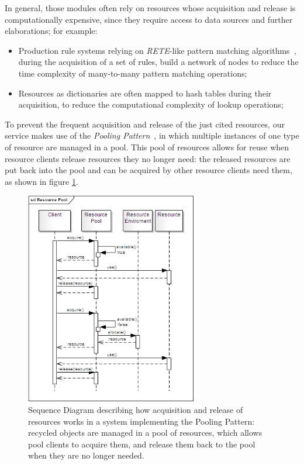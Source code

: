 \documentclass[11pt]{article}
\begin{document}
In general, those modules often rely on resources whose acquisition and release is computationally expensive, since they require access to data sources 
and further elaborations; for example:

\begin{itemize}
 \item Production rule systems relying on \emph{RETE}-like pattern matching algorithms~\citep{forgy}, during the acquisition of a set of rules, build a network of nodes
  to reduce the time complexity of many-to-many pattern matching operations;
 \item Resources as dictionaries are often mapped to hash tables during their acquisition, to reduce the computational complexity of lookup operations; 
\end{itemize}

To prevent the frequent acquisition and release of the just cited resources, our service makes use of the \emph{Pooling Pattern}~\citep{kircher2001}, 
in which multiple instances of one type of resource are managed in a pool.  This pool of resources allows for reuse when resource clients release resources
they no longer need: the released resources are put back into the pool and can be acquired by other resource clients need them, as shown in figure \ref{fig:rp}.

\begin{figure}[!ht]
\begin{center}
\includegraphics[width=7.5cm]{resource_pool}
\end{center}
\caption{Sequence Diagram describing how acquisition and release of resources works in a system implementing the Pooling Pattern: recycled objects are
managed in a pool of resources, which allows pool clients to acquire them, and release them back to the pool when they are no longer needed.}
\label{fig:rp}
\end{figure}
\end{document}
